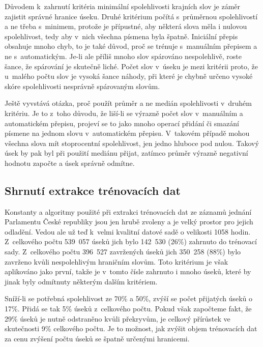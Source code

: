Důvodem k~zahrnutí kritéria minimální spolehlivosti krajních slov je záměr
zajistit správné hranice úseku. Druhé kritérium počítá s~průměrnou spolehlivostí
a ne třeba s~minimem, protože je přípustné, aby některá slova měla i nulovou
spolehlivost, tedy aby v~nich všechna písmena byla špatně. Iniciální přepis
obsahuje mnoho chyb, to je také důvod, proč se trénuje s~manuálním přepisem a ne
s~automatickým. Je-li ale příliš mnoho slov spárováno nespolehlivě, roste šance,
že spárování je skutečně liché. Počet slov v~úseku je mezi kritérii proto, že
u~malého počtu slov je vysoká šance náhody, při které je chybně určeno vysoké
skóre spolehlivosti nesprávně spárovaným slovům.

Ještě vyvstává otázka, proč použít průměr a ne medián spolehlivosti v~druhém
kritériu. Je to z~toho důvodu, že liší-li se výrazně počet slov v~manuálním a
automatickém přepisu, projeví se to jako mnoho operací přidání či smazání
písmene na jednom slovu v~automatickém přepisu. V~takovém případě
mohou všechna slova mít stoprocentní spolehlivost, jen jedno hluboce pod nulou.
Takový úsek by pak byl při použití mediánu přijat, zatímco průměr výrazně negativní
hodnotu započte a úsek správně odmítne.


\subsection{Shrnutí extrakce trénovacích dat}

Konstanty a algoritmy použité při extrakci trénovacích dat ze záznamů jednání
Parlamentu České republiky jsou jen hrubě zvoleny a je velký prostor pro jejich
odladění. Vedou ale už teď k~velmi kvalitní datové sadě o velikosti 1058 hodin.
Z~celkového počtu 539~057 úseků jich bylo 142~530 (26\%) zahrnuto do trénovací
sady. Z~celkového počtu 396~527 zavržených úseků jich 350~258 (88\%) bylo
zavrženo kvůli nespolehlivým hraničním slovům. Toto kritérium je však aplikováno
jako první, takže je v~tomto čísle zahrnuto i mnoho úseků, které by jinak byly
odmítnuty některým dalším kritériem.

Sníží-li se potřebná spolehlivost ze 70\% a 50\%, zvýší se počet přijatých úseků
o 17\%. Přidá se tak 5\% úseků z~celkového počtu. Pokud však započteme fakt, že
29\% úseků je nutně odstraněno kvůli překryvům, je celkový přírůstek ve
skutečnosti 9\% celkového počtu. Je to možnost, jak zvýšit objem trénovacích dat
za cenu zvýšení počtu úseků se špatně určenými hranicemi.

